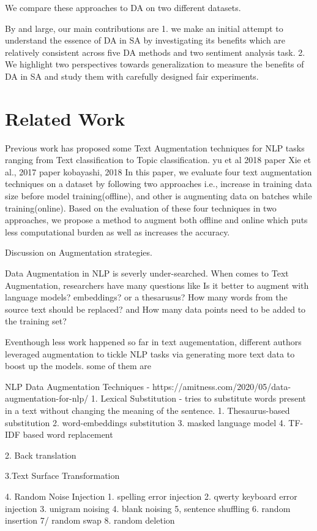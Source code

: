 \documentclass{article}
\begin{document}
We compare these approaches to DA on two different datasets.

By and large, our main contributions are
1. we make an initial attempt to understand the essence of DA in SA by investigating its benefits which are relatively consistent across five DA methods and two sentiment analysis task.
2. We highlight two perspectives towards generalization to measure the benefits of DA in SA and study them with carefully designed fair experiments.

\section{Related Work}
Previous work has proposed some Text Augmentation techniques for NLP tasks ranging from Text classification to Topic classification.
yu et al 2018 paper
Xie et al., 2017 paper
kobayashi, 2018
In this paper, we evaluate four text augmentation techniques on a dataset by following two approaches i.e., increase in training data size before model training(offline), and other is augmenting data on batches while training(online). Based on the evaluation of these four techniques in two approaches, we propose a method to augment both offline and online which puts less computational burden as well as increases the accuracy.


Discussion on Augmentation strategies.

Data Augmentation in NLP is severly under-searched. When comes to Text Augmentation, researchers have many questions like Is it better to augment with language models? embeddings? or a thesarusus? How many words from the source text should be replaced? and How many data points need to be added to the training set?

Eventhough less work happened so far in text augementation, different authors leveraged augmentation to tickle NLP tasks via generating more text data to boost up the models.
some of them are 




NLP Data Augmentation Techniques - https://amitness.com/2020/05/data-augmentation-for-nlp/
1. Lexical Substitution - tries to substitute words present in a text without changing the meaning of the sentence.
1. Thesaurus-based substitution
2. word-embeddings substitution
3. masked language model
4. TF-IDF based word replacement

2. Back translation

3.Text Surface Transformation

4. Random Noise Injection
1. spelling error injection
2. qwerty keyboard error injection
3. unigram noising
4. blank noising
5, sentence shuffling
6. random insertion
7/ random swap
8. random deletion
\end{document}
